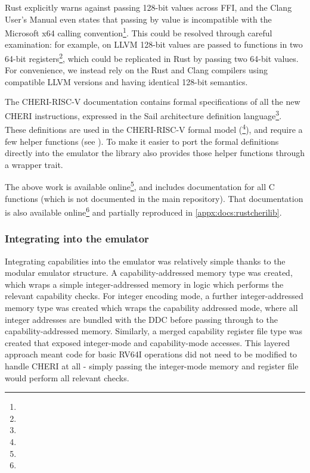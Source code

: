 Rust explicitly warns against passing 128-bit values across FFI, and the Clang User's Manual even states that passing  by value is incompatible with the Microsoft x64 calling convention\footnote{}.
This could be resolved through careful examination: for example, on LLVM 128-bit values are passed to functions in two 64-bit registers\footnote{}, which could be replicated in Rust by passing two 64-bit values.
For convenience, we instead rely on the Rust and Clang compilers using compatible LLVM versions and having identical 128-bit semantics.

The CHERI-RISC-V documentation contains formal specifications of all the new CHERI instructions, expressed in the Sail architecture definition  language\footnote{}.
These definitions are used in the CHERI-RISC-V formal model (\footnote{}), and require a few helper functions (see \cite[Chapter 8.2]{TR-951}).
To make it easier to port the formal definitions directly into the emulator the  library also provides those helper functions through a wrapper trait.

The above work is available online\footnote{}, and includes documentation for all C functions (which is not documented in the main repository).
That documentation is also available online\footnote{} and partially reproduced in \cref{appx:docs:rustcherilib}.

\subsubsection{Integrating into the emulator}
Integrating capabilities into the emulator was relatively simple thanks to the modular emulator structure.
A capability-addressed memory type was created, which wraps a simple integer-addressed memory in logic which performs the relevant capability checks.
For integer encoding mode, a further integer-addressed memory type was created which wraps the capability addressed mode, where all integer addresses are bundled with the DDC before passing through to the capability-addressed memory.
Similarly, a merged capability register file type was created that exposed integer-mode and capability-mode accesses.
This layered approach meant code for basic RV64I operations did not need to be modified to handle CHERI at all - simply passing the integer-mode memory and register file would perform all relevant checks.

